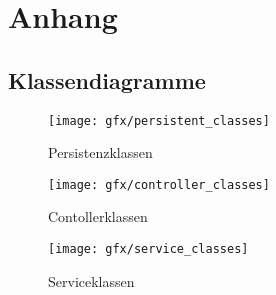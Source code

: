 \section{Anhang}
\subsection{Klassendiagramme}

\begin{figure}[H]
  \centering
  \texttt{[image: gfx/persistent\_classes]}
  \caption{Persistenzklassen}
\end{figure}

\begin{figure}[H]
  \centering
  \texttt{[image: gfx/controller\_classes]}
  \caption{Contollerklassen}
\end{figure}

\begin{figure}[H]
  \centering
  \texttt{[image: gfx/service\_classes]}
  \caption{Serviceklassen}
\end{figure}